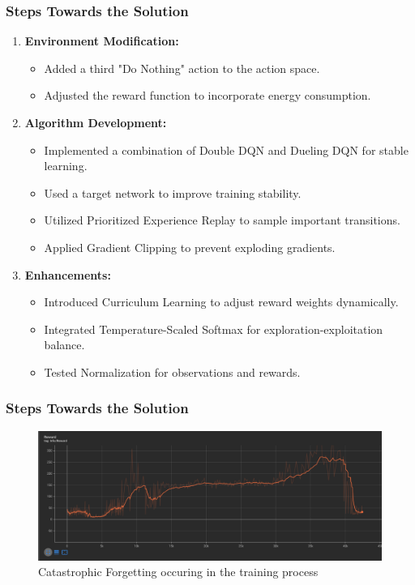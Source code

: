 \documentclass{beamer}
\begin{document}
\begin{frame}
\frametitle{Steps Towards the Solution}
\begin{enumerate}
    \item \textbf{Environment Modification:}
    \begin{itemize}
        \item Added a third "Do Nothing" action to the action space.
        \item Adjusted the reward function to incorporate energy consumption.
    \end{itemize}
    \item \textbf{Algorithm Development:}
    \begin{itemize}
        \item Implemented a combination of Double DQN and Dueling DQN for stable learning.
        \item Used a target network to improve training stability.
        \item Utilized Prioritized Experience Replay to sample important transitions.
        \item Applied Gradient Clipping to prevent exploding gradients.
    \end{itemize}
    \item \textbf{Enhancements:}
    \begin{itemize}
        \item Introduced Curriculum Learning to adjust reward weights dynamically.
        \item Integrated Temperature-Scaled Softmax for exploration-exploitation balance.
        \item Tested Normalization for observations and rewards.
    \end{itemize}
\end{enumerate}
\end{frame}

\begin{frame}
\frametitle{Steps Towards the Solution}
\begin{figure}[ht]
    \centering
    \includegraphics[width=1.0\textwidth]{images/catastrophic_forgetting.png}
    \caption{Catastrophic Forgetting occuring in the training process}
    \label{fig:catastrophic_forgetting}
\end{figure}
\end{frame}
\end{document}
